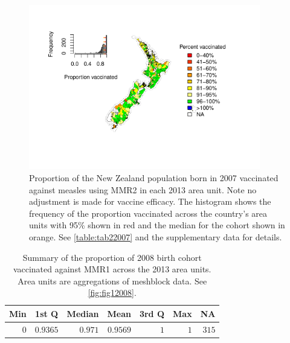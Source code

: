 \documentclass{article}
\begin{document}
\begin{figure}
\begin{center}
    \includegraphics[width=0.9\textwidth]{nir_census_MMR2_NIR_2007.pdf}
\end{center}
    \caption{Proportion of the New Zealand population born in 2007 vaccinated against measles using MMR2 in each 2013 area unit. Note no adjustment is made for vaccine efficacy. The histogram shows the frequency of the proportion vaccinated across the country's area units with 95\% shown in red and the median for the cohort shown in orange. See \autoref{table:tab22007} and the supplementary data for details.}
\label{fig:fig22007}
\end{figure}

 \vspace{5mm} %
\begin{table}
\begin{center}
\begin{tabular}{rrrrrrr}
\hline\hline
\multicolumn{1}{c}{Min}&\multicolumn{1}{c}{1st Q}&\multicolumn{1}{c}{Median}&\multicolumn{1}{c}{Mean}&\multicolumn{1}{c}{3rd Q}&\multicolumn{1}{c}{Max}&\multicolumn{1}{c}{NA}\tabularnewline
\hline
$0$&$0.9365$&$0.971$&$0.9569$&$1$&$1$&$315$\tabularnewline
\hline
\end{tabular}\end{center}\caption{Summary of the proportion of 2008 birth cohort vaccinated against MMR1 across the 2013 area units. Area units are aggregations of meshblock data. See \autoref{fig:fig12008}.}
\label{table:tab12008}
\end{table}
\end{document}
